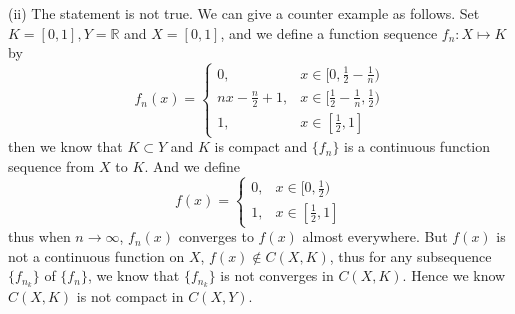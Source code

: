 \documentclass[12pt,a4paper]{ctexart}
\begin{document}
(ii) The statement is not true. We can give a counter example as follows. Set $K = [0, 1],Y = \mathbb{R}$ and $X = [0, 1]$, and we define a function sequence $f_{n}: X \mapsto K$ by
\begin{equation*}
f_{n}(x) =
\left\{
             \begin{array}{cl}
             0, & x \in [0, \frac{1}{2} - \frac{1}{n}) \\
             n x - \frac{n}{2} + 1, & x \in [\frac{1}{2} - \frac{1}{n}, \frac{1}{2}) \\
             1, & x \in [\frac{1}{2}, 1]
             \end{array}
\right.
\end{equation*}
then we know that $K \subset Y$ and $K$ is compact and $\{f_{n}\}$ is a continuous function sequence from $X$ to $K$. And we define
\begin{equation*}
f (x) =
\left\{
             \begin{array}{cl}
             0, & x \in [0, \frac{1}{2}) \\
             1, & x \in [\frac{1}{2}, 1]
             \end{array}
\right.
\end{equation*}
thus when $n \to \infty$, $f_{n}(x)$ converges to $f(x)$ almost everywhere. But $f(x)$ is not a continuous function on $X$, $f(x) \notin C(X, K)$, thus for any subsequence $\{f_{n_{k}}\}$ of $\{f_{n}\}$, we know that $\{f_{n_{k}}\}$ is not converges in $C(X, K)$. Hence we know $C(X,K)$ is not compact in $C(X, Y)$.
\end{document}
